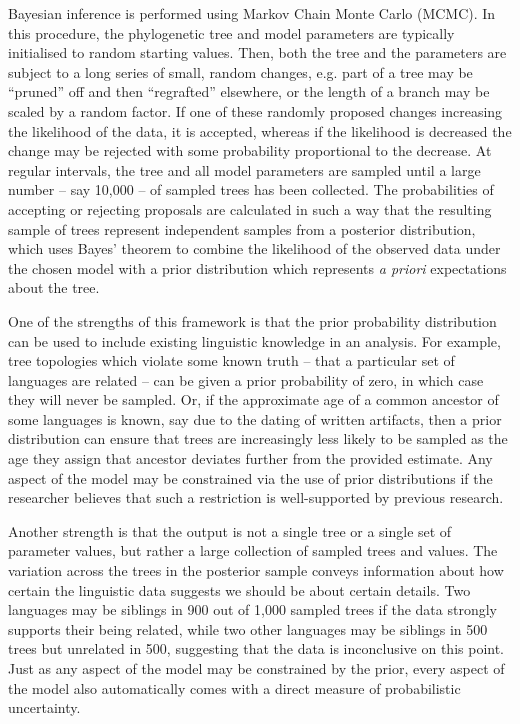 \documentclass[twocolumn,10pt]{scrartcl}
\begin{document}
Bayesian inference is performed using Markov Chain Monte Carlo (MCMC).  In this procedure, the phylogenetic tree and model parameters are typically initialised to random starting values. Then, both the tree and the parameters are subject to a long series of small, random changes, e.g. part of a tree may be ``pruned'' off and then ``regrafted'' elsewhere, or the length of a branch may be scaled by a random factor.  If one of these randomly proposed changes increasing the likelihood of the data, it is accepted, whereas if the likelihood is decreased the change may be rejected with some probability proportional to the decrease.  At regular intervals, the tree and all model parameters are sampled until a large number -- say 10,000 -- of sampled trees has been collected.  The probabilities of accepting or rejecting proposals are calculated in such a way that the resulting sample of trees represent independent samples from a posterior distribution, which uses Bayes' theorem to combine the likelihood of the observed data under the chosen model with a prior distribution which represents \emph{a priori} expectations about the tree.

One of the strengths of this framework is that the prior probability distribution can be used to include existing linguistic knowledge in an analysis.  For example, tree topologies which violate some known truth -- that a particular set of languages are related -- can be given a prior probability of zero, in which case they will never be sampled.  Or, if the approximate age of a common ancestor of some languages is known, say due to the dating of written artifacts, then a prior distribution can ensure that trees are increasingly less likely to be sampled as the age they assign that ancestor deviates further from the provided estimate.  Any aspect of the model may be constrained via the use of prior distributions if the researcher believes that such a restriction is well-supported by previous research.

Another strength is that the output is not a single tree or a single set of parameter values, but rather a large collection of sampled trees and values.  The variation across the trees in the posterior sample conveys information about how certain the linguistic data suggests we should be about certain details.  Two languages may be siblings in 900 out of 1,000 sampled trees if the data strongly supports their being related, while two other languages may be siblings in 500 trees but unrelated in 500, suggesting that the data is inconclusive on this point.  Just as any aspect of the model may be constrained by the prior, every aspect of the model also automatically comes with a direct measure of probabilistic uncertainty.
\end{document}
